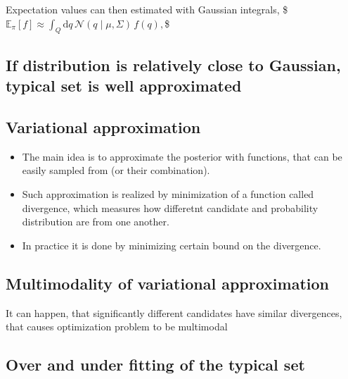 \documentclass[letterpaper,10pt,english]{jupyterBook}
\begin{document}
\sphinxAtStartPar
Expectation values can then estimated with Gaussian integrals,
\$\(
\mathbb{E}_{\pi} \! \left[ f \right]
\approx 
\int_{Q} \mathrm{d} q \, \mathcal{N} \! \left( q \mid \mu, \Sigma \right) \,
f \! \left( q \right),
\)\$


\subsection{If distribution is relatively close to Gaussian, typical set is well approximated}
\label{\detokenize{Lecture 3:if-distribution-is-relatively-close-to-gaussian-typical-set-is-well-approximated}}





\subsection{Variational approximation}
\label{\detokenize{Lecture 3:variational-approximation}}\begin{itemize}
\item {} 
\sphinxAtStartPar
The main idea is to approximate the posterior with functions, that can be easily sampled from (or their combination).

\item {} 
\sphinxAtStartPar
Such approximation is realized by minimization of a function called divergence, which measures how differetnt candidate and probability distribution are from one another.

\item {} 
\sphinxAtStartPar
In practice it is done by minimizing certain bound on the divergence.

\end{itemize}


\subsection{Multimodality of variational approximation}
\label{\detokenize{Lecture 3:multimodality-of-variational-approximation}}
\sphinxAtStartPar
It can happen, that significantly different candidates have similar divergences, that causes optimization problem to be multimodal






\subsection{Over and under fitting of the typical set}
\label{\detokenize{Lecture 3:over-and-under-fitting-of-the-typical-set}}
\end{document}

